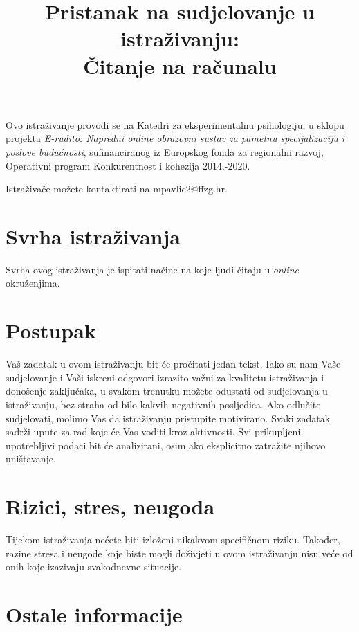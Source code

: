 \documentclass[11pt]{article}
\title{\bfseries \large Pristanak na sudjelovanje u istraživanju:\\
        \Large Čitanje na računalu}
\date{}
\author{}
\begin{document}
\maketitle

\vspace*{-4em}

\noindent Ovo istraživanje provodi se na Katedri za eksperimentalnu psihologiju, u sklopu
projekta \textit{E-rudito: Napredni online obrazovni sustav za pametnu
    specijalizaciju i poslove budućnosti}, sufinanciranog iz Europskog fonda za
regionalni razvoj, Operativni program Konkurentnost i kohezija 2014.-2020.

\vspace{6pt}

\noindent Istraživače možete kontaktirati na mpavlic2@ffzg.hr.

\section{Svrha istraživanja}

Svrha ovog istraživanja je ispitati načine na koje ljudi čitaju u \textit{online}
okruženjima.

\section{Postupak}

Vaš zadatak u ovom istraživanju bit će pročitati jedan tekst.
Iako su nam Vaše sudjelovanje i Vaši iskreni odgovori izrazito važni za
kvalitetu istraživanja i donošenje zaključaka, u svakom trenutku možete odustati
od sudjelovanja u istraživanju, bez
straha od bilo kakvih negativnih posljedica. Ako odlučite sudjelovati,
molimo Vas da istraživanju pristupite motivirano.
Svaki zadatak sadrži upute za rad koje će Vas voditi kroz aktivnosti.
Svi prikupljeni, upotrebljivi podaci bit će analizirani, osim ako eksplicitno
zatražite njihovo uništavanje.

\section{Rizici, stres, neugoda}

Tijekom istraživanja nećete biti izloženi nikakvom specifičnom riziku. Također,
razine stresa i neugode koje biste mogli doživjeti u ovom istraživanju nisu veće
od onih koje izazivaju svakodnevne situacije.

\section{Ostale informacije}
\end{document}
